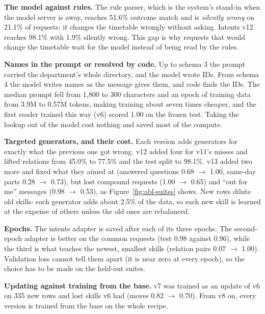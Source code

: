 \documentclass[11pt,a4paper]{article}
\begin{document}
\textbf{The model against rules.} The rule parser, which is the system's stand-in when the model server is away,
reaches 51.6\% outcome match and is \emph{silently wrong} on 21.1\% of requests: it changes the timetable wrongly
without asking. Intents v12 reaches 98.1\% with 1.9\% silently wrong. This gap is why requests that would change the
timetable wait for the model instead of being read by the rules.

\textbf{Names in the prompt or resolved by code.} Up to schema 3 the prompt carried the department's whole directory,
and the model wrote IDs. From schema 4 the model writes names as the message gives them, and code finds the IDs. The
median prompt fell from 1,800 to 300 characters and an epoch of training data from 3.9M to 0.57M tokens, making
training about seven times cheaper, and the first reader trained this way (v6) scored 1.00 on the frozen test.
Taking the lookup out of the model cost nothing and saved most of the compute.

\textbf{Targeted generators, and their cost.} Each version adds generators for exactly what the previous one got
wrong. v12 added four for v11's misses and lifted relations from 45.0\% to 77.5\% and the test split to 98.1\%. v13
added two more and fixed what they aimed at (answered questions 0.68 $\to$ 1.00, same-day parts 0.28 $\to$ 0.73), but
lost compound requests (1.00 $\to$ 0.65) and ``out for me'' messages (0.98 $\to$ 0.53), as Figure~\ref{fig:abl-suites}
shows. New rows dilute old skills: each generator adds about 2.5\% of the data, so each new skill is learned at the
expense of others unless the old ones are rebalanced.

\textbf{Epochs.} The intents adapter is saved after each of its three epochs. The second-epoch adapter is better on
the common requests (test 0.98 against 0.96), while the third is what teaches the newest, smallest skills
(relation pairs 0.07 $\to$ 1.00). Validation loss cannot tell them apart (it is near zero at every epoch), so the
choice has to be made on the held-out suites.

\textbf{Updating against training from the base.} v7 was trained as an update of v6 on 335 new rows and lost skills
v6 had (moves 0.82 $\to$ 0.70). From v8 on, every version is trained from the base on the whole recipe.
\end{document}
